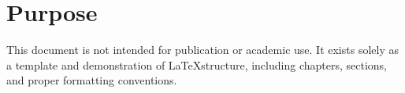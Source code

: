 \section{Purpose}
This document is not intended for publication or academic use. It exists solely as a template and demonstration of \LaTeX structure, including chapters, sections, and proper formatting conventions.

